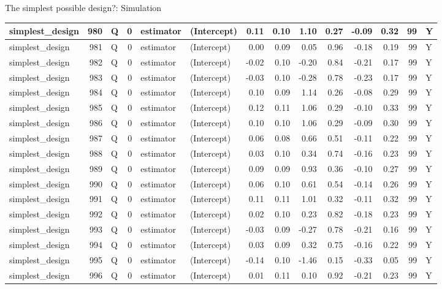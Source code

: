 \documentclass[
  11pt,
  ignorenonframetext,
]{beamer}
\begin{document}
\begin{frame}[fragile]{The simplest possible design?: Simulation}
\begin{tabular}{l|r|l|r|l|l|r|r|r|r|r|r|r|l}
\hline
simplest\_design & 980 & Q & 0 & estimator & (Intercept) & 0.11 & 0.10 & 1.10 & 0.27 & -0.09 & 0.32 & 99 & Y\\
\hline
simplest\_design & 981 & Q & 0 & estimator & (Intercept) & 0.00 & 0.09 & 0.05 & 0.96 & -0.18 & 0.19 & 99 & Y\\
\hline
simplest\_design & 982 & Q & 0 & estimator & (Intercept) & -0.02 & 0.10 & -0.20 & 0.84 & -0.21 & 0.17 & 99 & Y\\
\hline
simplest\_design & 983 & Q & 0 & estimator & (Intercept) & -0.03 & 0.10 & -0.28 & 0.78 & -0.23 & 0.17 & 99 & Y\\
\hline
simplest\_design & 984 & Q & 0 & estimator & (Intercept) & 0.10 & 0.09 & 1.14 & 0.26 & -0.08 & 0.29 & 99 & Y\\
\hline
simplest\_design & 985 & Q & 0 & estimator & (Intercept) & 0.12 & 0.11 & 1.06 & 0.29 & -0.10 & 0.33 & 99 & Y\\
\hline
simplest\_design & 986 & Q & 0 & estimator & (Intercept) & 0.10 & 0.10 & 1.06 & 0.29 & -0.09 & 0.30 & 99 & Y\\
\hline
simplest\_design & 987 & Q & 0 & estimator & (Intercept) & 0.06 & 0.08 & 0.66 & 0.51 & -0.11 & 0.22 & 99 & Y\\
\hline
simplest\_design & 988 & Q & 0 & estimator & (Intercept) & 0.03 & 0.10 & 0.34 & 0.74 & -0.16 & 0.23 & 99 & Y\\
\hline
simplest\_design & 989 & Q & 0 & estimator & (Intercept) & 0.09 & 0.09 & 0.93 & 0.36 & -0.10 & 0.27 & 99 & Y\\
\hline
simplest\_design & 990 & Q & 0 & estimator & (Intercept) & 0.06 & 0.10 & 0.61 & 0.54 & -0.14 & 0.26 & 99 & Y\\
\hline
simplest\_design & 991 & Q & 0 & estimator & (Intercept) & 0.11 & 0.11 & 1.01 & 0.32 & -0.11 & 0.32 & 99 & Y\\
\hline
simplest\_design & 992 & Q & 0 & estimator & (Intercept) & 0.02 & 0.10 & 0.23 & 0.82 & -0.18 & 0.23 & 99 & Y\\
\hline
simplest\_design & 993 & Q & 0 & estimator & (Intercept) & -0.03 & 0.09 & -0.27 & 0.78 & -0.21 & 0.16 & 99 & Y\\
\hline
simplest\_design & 994 & Q & 0 & estimator & (Intercept) & 0.03 & 0.09 & 0.32 & 0.75 & -0.16 & 0.22 & 99 & Y\\
\hline
simplest\_design & 995 & Q & 0 & estimator & (Intercept) & -0.14 & 0.10 & -1.46 & 0.15 & -0.33 & 0.05 & 99 & Y\\
\hline
simplest\_design & 996 & Q & 0 & estimator & (Intercept) & 0.01 & 0.11 & 0.10 & 0.92 & -0.21 & 0.23 & 99 & Y\\

\end{tabular}
\end{frame}
\end{document}
